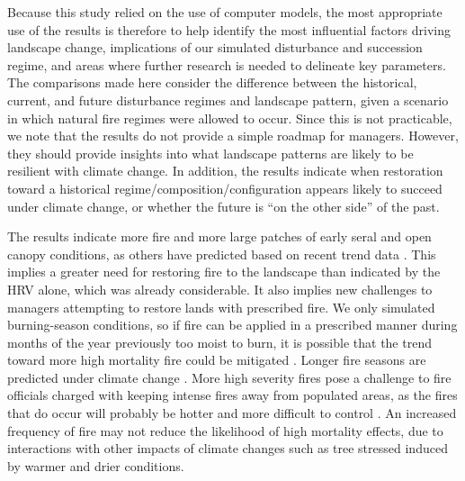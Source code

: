 \documentclass[12pt]{article}
\begin{document}
\begin{spacing}{1}
Because this study relied on the use of computer models, the most appropriate use of the results is therefore to help identify the most influential factors driving landscape change, implications of our simulated disturbance and succession regime, and areas where further research is needed to delineate key parameters. The comparisons made here consider the difference between the historical, current, and future disturbance regimes and landscape pattern, given a scenario in which natural fire regimes were allowed to occur. Since this is not practicable, we note that the results do not provide a simple roadmap for managers. However, they should provide insights into what landscape patterns are likely to be resilient with climate change. In addition, the results indicate when restoration toward a historical regime/composition/configuration appears likely to succeed under climate change, or whether the future is ``on the other side'' of the past. 

The results indicate more fire and more large patches of early seral and open canopy conditions, as others have predicted based on recent trend data \citep{Westerling2011,Stephens2013,Miller2012}. This implies a greater need for restoring fire to the landscape than indicated by the HRV alone, which was already considerable. It also implies new challenges to managers attempting to restore lands with prescribed fire. We only simulated burning-season conditions, so if fire can be applied in a prescribed manner during months of the year previously too moist to burn, it is possible that the trend toward more high mortality fire could be mitigated \citep{Schmidt2008,North2012}. Longer fire seasons are predicted under climate change \citep{McKenzie2004}. More high severity fires pose a challenge to fire officials charged with keeping intense fires away from populated areas, as the fires that do occur will probably be hotter and more difficult to control \citep{Schmidt2008}. An increased frequency of fire may not reduce the likelihood of high mortality effects, due to interactions with other impacts of climate changes such as tree stressed induced by warmer and drier conditions.


\end{spacing}
\end{document}
